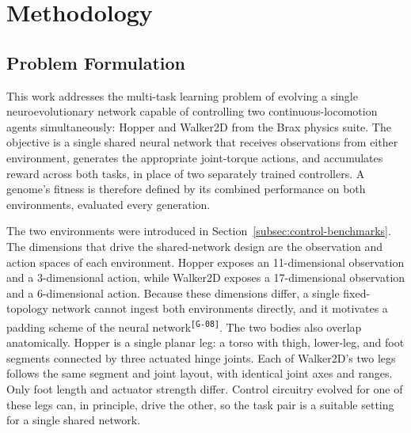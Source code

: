 \documentclass[12pt]{article}
\newcommand{\revID}[1]{\textsuperscript{\scriptsize\texttt{[#1]}}}
\newcommand{\revGram}[2]{\textcolor{lrRed}{#2}\revID{#1}}       %
\begin{document}


\section{Methodology}
\label{sec:methodology}

\subsection{Problem Formulation}
\label{subsec:problem-formulation}

This work addresses the multi-task learning problem of evolving a single neuroevolutionary network capable of controlling two continuous-locomotion agents simultaneously: Hopper and Walker2D from the Brax physics suite.
The objective is a single shared neural network that receives observations from either environment, generates the appropriate joint-torque actions, and accumulates reward across both tasks, in place of two separately trained controllers.
A genome's fitness is therefore defined by its combined performance on both environments, evaluated every generation.

The two environments were introduced in Section~\ref{subsec:control-benchmarks}. The dimensions that drive the shared-network design are the observation and action spaces of each environment.
Hopper exposes an 11-dimensional observation and a 3-dimensional action, while Walker2D exposes a 17-dimensional observation and a 6-dimensional action.
Because these dimensions differ, a single fixed-topology network cannot ingest both environments directly, \revGram{G-08}{and it motivates a padding scheme of the neural network}.
The two bodies also overlap anatomically.
Hopper is a single planar leg: a torso with thigh, lower-leg, and foot segments connected by three actuated hinge joints.
Each of Walker2D's two legs follows the same segment and joint layout, with identical joint axes and ranges. Only foot length and actuator strength differ.
Control circuitry evolved for one of these legs can, in principle, drive the other, so the task pair is a suitable setting for a single shared network.
\end{document}
